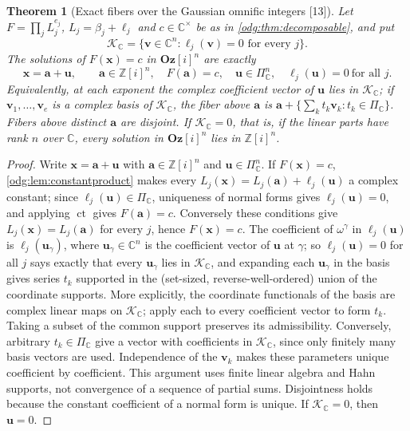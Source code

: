 \documentclass[11pt,oneside]{article}
\numberwithin{equation}{section}
\newtheorem{theorem}{Theorem}[section]
\theoremstyle{definition}
\theoremstyle{remark}
\newcommand{\Oz}{\mathbf{Oz}}
\newcommand{\Z}{\mathbb Z}
\newcommand{\C}{\mathbb C}
\newcommand{\ct}{\operatorname{ct}}
\newcommand{\src}[1]{\textup{\textsf{\small[#1]}}}
\newcommand{\Og}{\Oz[i]}
\begin{document}
\begin{theorem}[Exact fibers over the Gaussian omnific integers \src{13}]\label{odg:dec:thm:gaussianfibers}
Let $F=\prod_jL_j^{e_j}$, $L_j=\beta_j+\ell_j$ and $c\in\C^\times$ be as in
\cref{odg:thm:decomposable}, and put
\[
 \mathcal K_{\C}=\{\mathbf v\in\C^n:\ell_j(\mathbf v)=0\text{ for every }j\}.
\]
The solutions of $F(\mathbf x)=c$ in $\Og^n$ are exactly
\begin{equation}\label{odg:dec:eq:gaussianfiber}
 \mathbf x=\mathbf a+\mathbf u,\qquad \mathbf a\in\Z[i]^n,
 \quad F(\mathbf a)=c,
 \quad \mathbf u\in\Pi_{\C}^n,
 \quad \ell_j(\mathbf u)=0\ \text{for all }j .
\end{equation}
Equivalently, at each exponent the complex coefficient vector of $\mathbf u$
lies in $\mathcal K_{\C}$; if $\mathbf v_1,\ldots,\mathbf v_e$ is a complex
basis of $\mathcal K_{\C}$, the fiber above $\mathbf a$ is
$\mathbf a+\{\sum_kt_k\mathbf v_k:t_k\in\Pi_{\C}\}$. Fibers above distinct
$\mathbf a$ are disjoint. If $\mathcal K_{\C}=0$, that is, if the linear parts
have rank $n$ over $\C$, every solution in $\Og^n$ lies in $\Z[i]^n$.
\end{theorem}
\begin{proof}
Write $\mathbf x=\mathbf a+\mathbf u$ with $\mathbf a\in\Z[i]^n$ and
$\mathbf u\in\Pi_{\C}^n$. If $F(\mathbf x)=c$, \cref{odg:lem:constantproduct}
makes every $L_j(\mathbf x)=L_j(\mathbf a)+\ell_j(\mathbf u)$ a complex
constant; since $\ell_j(\mathbf u)\in\Pi_{\C}$, uniqueness of normal forms gives
$\ell_j(\mathbf u)=0$, and applying $\ct$ gives $F(\mathbf a)=c$. Conversely
these conditions give $L_j(\mathbf x)=L_j(\mathbf a)$ for every $j$, hence
$F(\mathbf x)=c$. The coefficient of $\omega^\gamma$ in $\ell_j(\mathbf u)$ is
$\ell_j(\mathbf u_\gamma)$, where $\mathbf u_\gamma\in\C^n$ is the coefficient
vector of $\mathbf u$ at $\gamma$; so $\ell_j(\mathbf u)=0$ for all $j$ says
exactly that every $\mathbf u_\gamma$ lies in $\mathcal K_{\C}$, and expanding
each $\mathbf u_\gamma$ in the basis gives series $t_k$ supported in the
(set-sized, reverse-well-ordered) union of the coordinate supports.
More explicitly, the coordinate functionals of the basis are complex
linear maps on $\mathcal K_{\C}$; apply each to every coefficient vector
to form $t_k$. Taking a subset of the common support preserves its
admissibility. Conversely, arbitrary $t_k\in\Pi_{\C}$ give a vector
with coefficients in $\mathcal K_{\C}$, since only finitely many basis
vectors are used. Independence of the $\mathbf v_k$ makes these parameters
unique coefficient by coefficient. This argument uses finite linear
algebra and Hahn supports, not convergence of a sequence of partial sums.
Disjointness holds because the constant coefficient of a normal form is
unique. If $\mathcal K_{\C}=0$, then $\mathbf u=0$.
\end{proof}
\end{document}

